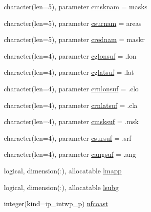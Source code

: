\begin{DoxyCompactItemize}
\item 
character(len=5), parameter \hyperlink{namespacemod__oasis__namcouple_aeeda85bec8a449e87411d4ed404322c5}{cmsknam} = \textquotesingle{}masks\textquotesingle{}
\item 
character(len=5), parameter \hyperlink{namespacemod__oasis__namcouple_a49e79935fc2421fe3e4e7422f17b34ea}{csurnam} = \textquotesingle{}areas\textquotesingle{}
\item 
character(len=5), parameter \hyperlink{namespacemod__oasis__namcouple_a161fc23acf442c75c9d6ba7758937d59}{crednam} = \textquotesingle{}maskr\textquotesingle{}
\item 
character(len=4), parameter \hyperlink{namespacemod__oasis__namcouple_ac1a557cecb41295e7d5cb004a7937ea4}{cglonsuf} = \textquotesingle{}.lon\textquotesingle{}
\item 
character(len=4), parameter \hyperlink{namespacemod__oasis__namcouple_a2036218f05c62fc672bd07ece34f26db}{cglatsuf} = \textquotesingle{}.lat\textquotesingle{}
\item 
character(len=4), parameter \hyperlink{namespacemod__oasis__namcouple_ae56f031c6d9a819a39fe5170f42d7ce1}{crnlonsuf} = \textquotesingle{}.clo\textquotesingle{}
\item 
character(len=4), parameter \hyperlink{namespacemod__oasis__namcouple_acdc7f0d582616ee9e18470aad433ed3a}{crnlatsuf} = \textquotesingle{}.cla\textquotesingle{}
\item 
character(len=4), parameter \hyperlink{namespacemod__oasis__namcouple_aeea3ba680d5ba05a432c12d64c68c8af}{cmsksuf} = \textquotesingle{}.msk\textquotesingle{}
\item 
character(len=4), parameter \hyperlink{namespacemod__oasis__namcouple_adf2c151a84c37bd7cd93867305b4f70b}{csursuf} = \textquotesingle{}.srf\textquotesingle{}
\item 
character(len=4), parameter \hyperlink{namespacemod__oasis__namcouple_a4b921aeee4d921557ab0cd2f0e541dad}{cangsuf} = \textquotesingle{}.ang\textquotesingle{}
\item 
logical, dimension(\+:), allocatable \hyperlink{namespacemod__oasis__namcouple_a8eca7c715a39c523e00ed2be0612950d}{lmapp}
\item 
logical, dimension(\+:), allocatable \hyperlink{namespacemod__oasis__namcouple_acda1605129987d656360e1ed81e8d199}{lsubg}
\item 
integer(kind=ip\+\_\+intwp\+\_\+p) \hyperlink{namespacemod__oasis__namcouple_a57f1b6f111a5257a4d6f5a4b18fa6250}{nfcoast}
\item 

\end{DoxyCompactItemize}
